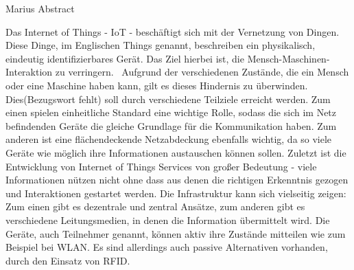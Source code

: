 Marius Abstract

Das Internet of Things - IoT - beschäftigt sich mit der Vernetzung von Dingen. Diese Dinge, im Englischen Things genannt, beschreiben ein physikalisch, eindeutig identifizierbares Gerät. Das Ziel hierbei ist, die Mensch-Maschinen-Interaktion zu verringern.  Aufgrund der verschiedenen Zustände, die ein Mensch oder eine Maschine haben kann, gilt es dieses Hindernis zu überwinden. Dies(Bezugswort fehlt) soll durch verschiedene Teilziele erreicht werden. Zum einen spielen einheitliche Standard eine wichtige Rolle, sodass die sich im Netz befindenden Geräte die gleiche Grundlage für die Kommunikation haben. Zum anderen ist eine flächendeckende Netzabdeckung ebenfalls wichtig, da so viele Geräte wie möglich ihre Informationen austauschen können sollen. Zuletzt ist die Entwicklung von Internet of Things Services von großer Bedeutung - viele Informationen nützen nicht ohne dass aus denen die richtigen Erkenntnis gezogen und Interaktionen gestartet werden. Die Infrastruktur kann sich vielseitig zeigen: Zum einen gibt es dezentrale und zentral Ansätze, zum anderen gibt es verschiedene Leitungsmedien, in denen die Information übermittelt wird. Die Geräte, auch Teilnehmer genannt, können aktiv ihre Zustände mitteilen wie zum Beispiel bei WLAN. Es sind allerdings auch passive Alternativen vorhanden, durch den Einsatz von RFID.
